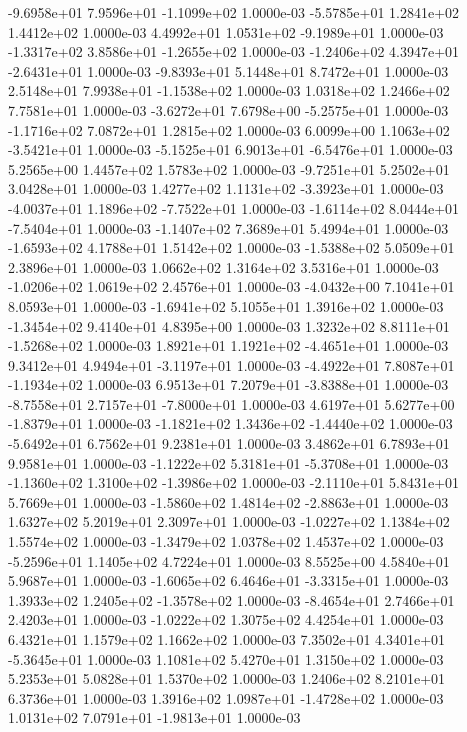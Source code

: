 -9.6958e+01  7.9596e+01 -1.1099e+02  1.0000e-03
-5.5785e+01  1.2841e+02  1.4412e+02  1.0000e-03
 4.4992e+01  1.0531e+02 -9.1989e+01  1.0000e-03
-1.3317e+02  3.8586e+01 -1.2655e+02  1.0000e-03
-1.2406e+02  4.3947e+01 -2.6431e+01  1.0000e-03
-9.8393e+01  5.1448e+01  8.7472e+01  1.0000e-03
 2.5148e+01  7.9938e+01 -1.1538e+02  1.0000e-03
1.0318e+02 1.2466e+02 7.7581e+01  1.0000e-03
-3.6272e+01  7.6798e+00 -5.2575e+01  1.0000e-03
-1.1716e+02  7.0872e+01  1.2815e+02  1.0000e-03
 6.0099e+00  1.1063e+02 -3.5421e+01  1.0000e-03
-5.1525e+01  6.9013e+01 -6.5476e+01  1.0000e-03
5.2565e+00 1.4457e+02 1.5783e+02  1.0000e-03
-9.7251e+01  5.2502e+01  3.0428e+01  1.0000e-03
 1.4277e+02  1.1131e+02 -3.3923e+01  1.0000e-03
-4.0037e+01  1.1896e+02 -7.7522e+01  1.0000e-03
-1.6114e+02  8.0444e+01 -7.5404e+01  1.0000e-03
-1.1407e+02  7.3689e+01  5.4994e+01  1.0000e-03
-1.6593e+02  4.1788e+01  1.5142e+02  1.0000e-03
-1.5388e+02  5.0509e+01  2.3896e+01  1.0000e-03
1.0662e+02 1.3164e+02 3.5316e+01  1.0000e-03
-1.0206e+02  1.0619e+02  2.4576e+01  1.0000e-03
-4.0432e+00  7.1041e+01  8.0593e+01  1.0000e-03
-1.6941e+02  5.1055e+01  1.3916e+02  1.0000e-03
-1.3454e+02  9.4140e+01  4.8395e+00  1.0000e-03
 1.3232e+02  8.8111e+01 -1.5268e+02  1.0000e-03
 1.8921e+01  1.1921e+02 -4.4651e+01  1.0000e-03
 9.3412e+01  4.9494e+01 -3.1197e+01  1.0000e-03
-4.4922e+01  7.8087e+01 -1.1934e+02  1.0000e-03
 6.9513e+01  7.2079e+01 -3.8388e+01  1.0000e-03
-8.7558e+01  2.7157e+01 -7.8000e+01  1.0000e-03
 4.6197e+01  5.6277e+00 -1.8379e+01  1.0000e-03
-1.1821e+02  1.3436e+02 -1.4440e+02  1.0000e-03
-5.6492e+01  6.7562e+01  9.2381e+01  1.0000e-03
3.4862e+01 6.7893e+01 9.9581e+01  1.0000e-03
-1.1222e+02  5.3181e+01 -5.3708e+01  1.0000e-03
-1.1360e+02  1.3100e+02 -1.3986e+02  1.0000e-03
-2.1110e+01  5.8431e+01  5.7669e+01  1.0000e-03
-1.5860e+02  1.4814e+02 -2.8863e+01  1.0000e-03
1.6327e+02 5.2019e+01 2.3097e+01  1.0000e-03
-1.0227e+02  1.1384e+02  1.5574e+02  1.0000e-03
-1.3479e+02  1.0378e+02  1.4537e+02  1.0000e-03
-5.2596e+01  1.1405e+02  4.7224e+01  1.0000e-03
8.5525e+00 4.5840e+01 5.9687e+01  1.0000e-03
-1.6065e+02  6.4646e+01 -3.3315e+01  1.0000e-03
 1.3933e+02  1.2405e+02 -1.3578e+02  1.0000e-03
-8.4654e+01  2.7466e+01  2.4203e+01  1.0000e-03
-1.0222e+02  1.3075e+02  4.4254e+01  1.0000e-03
6.4321e+01 1.1579e+02 1.1662e+02  1.0000e-03
 7.3502e+01  4.3401e+01 -5.3645e+01  1.0000e-03
1.1081e+02 5.4270e+01 1.3150e+02  1.0000e-03
5.2353e+01 5.0828e+01 1.5370e+02  1.0000e-03
1.2406e+02 8.2101e+01 6.3736e+01  1.0000e-03
 1.3916e+02  1.0987e+01 -1.4728e+02  1.0000e-03
 1.0131e+02  7.0791e+01 -1.9813e+01  1.0000e-03
